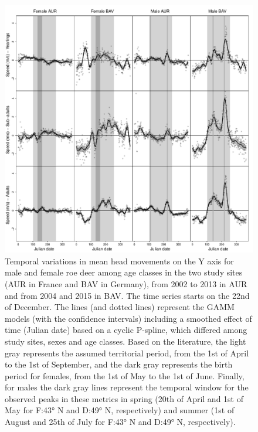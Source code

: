 \documentclass[a4paper,11pt]{article}
\begin{document}
\newpage
\begin{figure} [!h]
  \centering
  \includegraphics[width=0.9\linewidth]{./figures/Fig3b.pdf}
  \caption{Temporal variations in mean head movements on the Y axis
    for male and female roe deer among age classes in the two study
    sites (AUR in France and BAV in Germany), from 2002 to 2013 in AUR
    and from 2004 and 2015 in BAV. The time series starts on the 22nd
    of December. The lines (and dotted lines) represent the GAMM
    models (with the confidence intervals) including a smoothed effect
    of time (Julian date) based on a cyclic P-spline, which differed
    among study sites, sexes and age classes. Based on the literature,
    the light gray represents the assumed territorial period, from the
    1st of April to the 1st of September, and the dark gray represents
    the birth period for females, from the 1st of May to the 1st of
    June. Finally, for males the dark gray lines represent the
    temporal window for the observed peaks in these metrics in spring
    (20th of April and 1st of May for F:43° N and D:49° N,
    respectively) and summer (1st of August and 25th of July for F:43°
    N and D:49° N, respectively).}
\end{figure}
\end{document}
